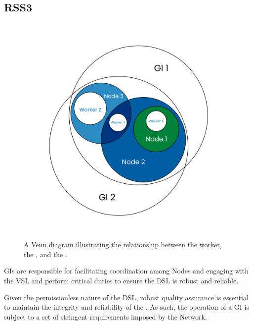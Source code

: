 \subsection{RSS3 }
\label{subsec:GI}

{
    \begin{figure}[tb!]
        \centering
        \includegraphics[width=0.8\columnwidth]{figures/GI.png}
        \caption{A Venn diagram illustrating the relationship between the worker, the , and the .}
        \label{fig:GI}
    \end{figure}
}

\glspl{GI} are responsible for facilitating coordination among \glspl{Node} and engaging with the \gls{VSL} and perform critical duties to ensure the \gls{DSL} is robust and reliable.

Given the permissionless nature of the \gls{DSL}, robust quality assurance is essential to maintain the integrity and reliability of the .
As such, the operation of a \gls{GI} is subject to a set of stringent requirements imposed by the Network.

